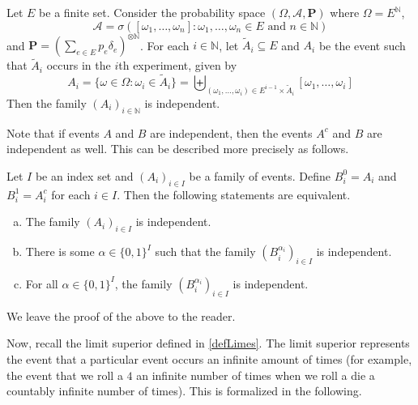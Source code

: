\begin{theorem}
\label{product measure independence}
    Let $E$ be a finite set. Consider the probability space $(\Omega,\mathcal{A},\textbf{P})$ where $\Omega=E^\mathbb{N}$,
    $$\mathcal{A}=\sigma([\omega_1,\ldots,\omega_n]:\omega_1,\ldots,\omega_n\in E\text{ and }n\in\mathbb{N})$$
    and $\textbf{P}=\left(\sum_{e\in E}p_e\delta_e\right)^{\otimes\mathbb{N}}$. For each $i\in\mathbb{N}$, let $\tilde A_i\subseteq E$ and $A_i$ be the event such that $\tilde A_i$ occurs in the $i$th experiment, given by
    $$A_i = \{\omega\in\Omega:\omega_i\in\tilde A_i\}
    =\biguplus_{(\omega_1,\ldots,\omega_i)\in E^{i-1}\times \tilde A_i} [\omega_1,\ldots,\omega_i]$$
  Then the family $(A_i)_{i\in\mathbb{N}}$ is independent.
\end{theorem}


\vspace{2mm}
Note that if events $A$ and $B$ are independent, then the events $A^c$ and $B$ are independent as well. This can be described more precisely as follows.

\begin{theorem}
    Let $I$ be an index set and $(A_i)_{i\in I}$ be a family of events. Define $B_i^0 = A_i$ and $B_i^1 = A_i^c$ for each $i\in I$. Then the following statements are equivalent.
    \begin{enumerate}[(a)]
        \item The family $(A_i)_{i\in I}$ is independent.
        \item There is some $\alpha\in\{0,1\}^I$ such that the family $(B_i^{\alpha_i})_{i\in I}$ is independent.
        \item For all $\alpha\in\{0,1\}^I$, the family $(B_i^{\alpha_i})_{i\in I}$ is independent.
    \end{enumerate}
\end{theorem}

We leave the proof of the above to the reader.

Now, recall the limit superior defined in \cref{defLimes}. The limit superior represents the event that a particular event occurs an infinite amount of times (for example, the event that we roll a $4$ an infinite number of times when we roll a die a countably infinite number of times). This is formalized in the following.

